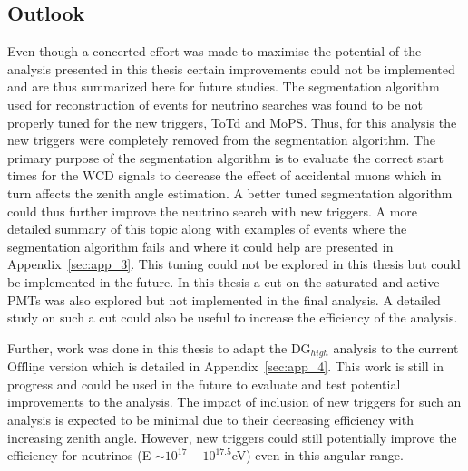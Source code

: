 \subsection*{Outlook}
Even though a concerted effort was made to maximise the potential of the analysis presented in this thesis certain improvements could not be implemented and are thus summarized here for future studies. The segmentation algorithm used for reconstruction of events for neutrino searches was found to be not properly tuned for the new triggers, ToTd and MoPS. Thus, for this analysis the new triggers were completely removed from the segmentation algorithm. The primary purpose of the segmentation algorithm is to evaluate the correct start times for the WCD signals to decrease the effect of accidental muons which in turn affects the zenith angle estimation. A better tuned segmentation algorithm could thus further improve the neutrino search with new triggers. A more detailed summary of this topic along with examples of events where the segmentation algorithm fails and where it could help are presented in Appendix~\ref{sec:app_3}. This tuning could not be explored in this thesis but could be implemented in the future. In this thesis a cut on the saturated and active PMTs was also explored but not implemented in the final analysis. A detailed study on such a cut could also be useful to increase the efficiency of the analysis. 

Further, work was done in this thesis to adapt the DG$_{high}$ analysis to the current $\mathrm{\overline{Off} \underline{line}}$ version which is detailed in Appendix~\ref{sec:app_4}. This work is still in progress and could be used in the future to evaluate and test potential improvements to the analysis. The impact of inclusion of new triggers for such an analysis is expected to be minimal due to their decreasing efficiency with increasing zenith angle. However, new triggers could still potentially improve the efficiency for neutrinos (E $\sim 10^{17}-10^{17.5}$eV) even in this angular range. 

